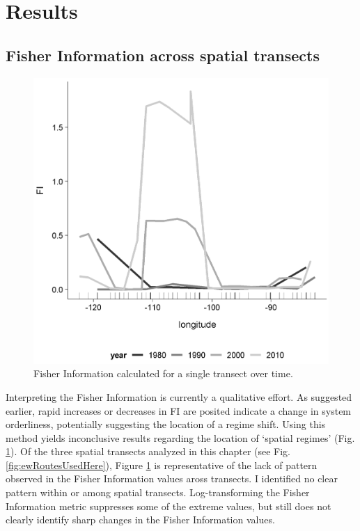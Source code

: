 \documentclass[12pt,twoside,openany]{reedthesis}
\begin{document}
\hypertarget{results-1}{%
\section{Results}\label{results-1}}

\hypertarget{fisher-information-across-spatial-transects}{%
\subsection{Fisher Information across spatial transects}\label{fisher-information-across-spatial-transects}}
\begin{figure}
\includegraphics[width=0.85\linewidth]{./chapterFiles/fisherSpatial/figures/figsCalledInDiss/transect_12_East-West_metric_FI_Eqn7_12} \caption{Fisher Information calculated for a single transect over time.}\label{fig:fi1Tsect}
\end{figure}
Interpreting the Fisher Information is currently a qualitative effort. As suggested earlier, rapid increases or decreases in FI are posited indicate a change in system orderliness, potentially suggesting the location of a regime shift. Using this method yields inconclusive results regarding the location of `spatial regimes' (Fig. \ref{fig:fi1Tsect}). Of the three spatial transects analyzed in this chapter (see Fig. \ref{fig:ewRoutesUsedHere}), Figure \ref{fig:fi1Tsect} is representative of the lack of pattern observed in the Fisher Information values aross transects. I identified no clear pattern within or among spatial transects. Log-transforming the Fisher Information metric suppresses some of the extreme values, but still does not clearly identify sharp changes in the Fisher Information values.
\end{document}
